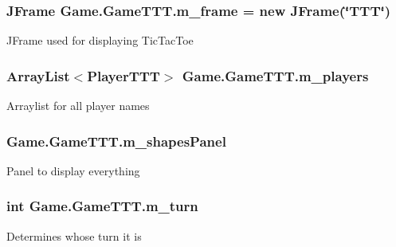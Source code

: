 \subsubsection[{m\+\_\+frame}]{\setlength{\rightskip}{0pt plus 5cm}J\+Frame Game.\+Game\+T\+T\+T.\+m\+\_\+frame = new J\+Frame(\char`\"{}T\+T\+T\char`\"{})\hspace{0.3cm}{\ttfamily [private]}}\label{class_game_1_1_game_t_t_t_a1ddfe813d586411f16504069d6bddf5d}
J\+Frame used for displaying Tic\+Tac\+Toe \hypertarget{class_game_1_1_game_t_t_t_aad75ff74595b7b58542d7060a77ca169}{}
\subsubsection[{m\+\_\+players}]{\setlength{\rightskip}{0pt plus 5cm}Array\+List$<${\bf Player\+T\+T\+T}$>$ Game.\+Game\+T\+T\+T.\+m\+\_\+players\hspace{0.3cm}{\ttfamily [private]}}\label{class_game_1_1_game_t_t_t_aad75ff74595b7b58542d7060a77ca169}
Arraylist for all player names \hypertarget{class_game_1_1_game_t_t_t_a6b2de64f05009047dd3a01867da865c0}{}
\subsubsection[{m\+\_\+shapes\+Panel}]{ Game.\+Game\+T\+T\+T.\+m\+\_\+shapes\+Panel\hspace{0.3cm}{\ttfamily [private]}}\label{class_game_1_1_game_t_t_t_a6b2de64f05009047dd3a01867da865c0}
Panel to display everything \hypertarget{class_game_1_1_game_t_t_t_a2a4f4d1d24717d2629a2560421e926bc}{}
\subsubsection[{m\+\_\+turn}]{\setlength{\rightskip}{0pt plus 5cm}int Game.\+Game\+T\+T\+T.\+m\+\_\+turn\hspace{0.3cm}{\ttfamily [private]}}\label{class_game_1_1_game_t_t_t_a2a4f4d1d24717d2629a2560421e926bc}
Determines whose turn it is \hypertarget{class_game_1_1_game_t_t_t_ad1efe890e60af4826d664276e1e49ea4}{}
